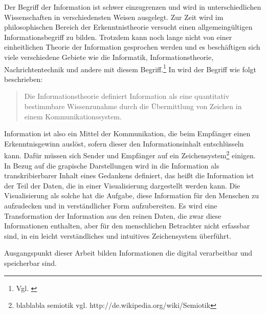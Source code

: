 \documentclass[a4paper, 12pt, DIVcalc, onepage, pdftex, headsepline, footsepline]{scrreprt}
\begin{document}
Der Begriff der Information ist schwer einzugrenzen und wird in unterschiedlichen Wissenschaften
in verschiedensten Weisen ausgelegt. Zur Zeit wird im philosophischen Bereich der Erkenntnistheorie versucht
einen allgemeingültigen Informationsbegriff zu bilden. Trotzdem kann noch lange nicht von einer
einheitlichen Theorie der Information gesprochen werden und es beschäftigen sich viele verschiedene
Gebiete wie die Informatik, Informationstheorie, Nachrichtentechnik und andere mit diesem
Begriff.\footnote{Vgl. \citep{wiki_info}} In \citep[S.\,3]{Hoeher} wird der Begriff wie folgt beschrieben:
\begin{quote}
Die Informationstheorie definiert Information als eine quantitativ bestimmbare Wissenzunahme durch
die Übermittlung von Zeichen in einem Kommunikationssystem.
\end{quote}
Information ist also ein Mittel der Kommunikation, die beim Empfänger einen Erkenntnisgewinn auslöst,
sofern dieser den Informationsinhalt entschlüsseln kann. Dafür müssen sich Sender und Empfänger
auf ein Zeichensystem\footnote{blablabla semiotik vgl. http://de.wikipedia.org/wiki/Semiotik} einigen.
In Bezug auf die grapische Darstellungen wird in \citep{Bertin} die Information als  transkribierbarer
Inhalt eines Gedankens definiert, das heißt die Information ist der Teil der Daten, die in einer
Visualisierung dargestellt werden kann. Die Visualisierung als solche hat die Aufgabe, diese Information
für den Menschen zu aufzudecken und in verständlicher Form aufzubereiten. Es wird eine Transformation
der Information aus den reinen Daten, die zwar diese Informationen enthalten, aber für den menschlichen
Betrachter nicht erfassbar sind, in ein leicht verständliches und intuitives Zeichensystem überführt.

Ausgangspunkt dieser Arbeit bilden Informationen die digital verarbeitbar und speicherbar sind.
\end{document}
